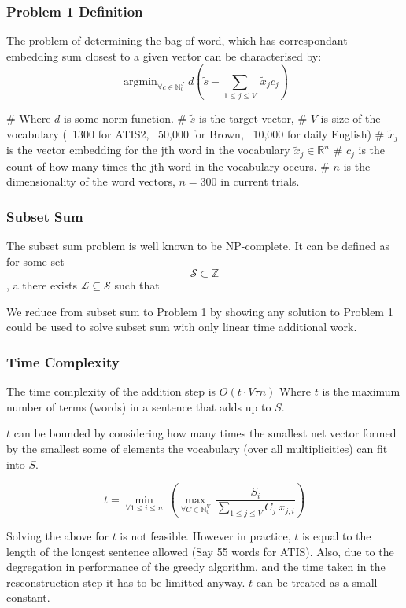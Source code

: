 \documentclass[]{scrartcl}
\DeclareMathOperator*{\argmin}{argmin}
\begin{document}
\subsubsection{{Problem 1 Definition}}
The problem of determining the bag of word, which has correspondant embedding sum closest to a given vector can be characterised by:
$$\argmin_{\forall c\in\mathbb{N}_0^J} d(\tilde{s} - \sum_{1\le j\le V}\:\tilde{x}_{j}c_{j})$$
\begin{easylist}[itemize]
# Where $d$ is some norm function.
# $\tilde{s}$ is the target vector,
# $V$ is size of the vocabulary (~1300 for ATIS2, ~50,000 for Brown, ~10,000 for daily English)
# $\tilde{x}_j$ is the vector embedding for the jth word in the vocabulary $\tilde{x}_j \in \mathbb{R}^n$
# $c_j$ is the count of how many times the jth word in the vocabulary occurs.
# $n$ is the dimensionality of the word vectors, $n = 300$ in current trials.  
\end{easylist}

\subsubsection{Subset Sum}
The subset sum problem is well known to be NP-complete.
It can be defined as for some set $$\mathcal{S}\subset\mathbb{Z}$$, a there exists  $\mathcal{L}\subseteq\mathcal{S}$ such that 


We reduce from subset sum to Problem 1 by showing any solution to Problem 1 could be used to solve subset sum with only linear time additional work.





\subsubsection{Time Complexity}
The time complexity of the addition step is $O(t \cdot V\tau n)$
Where $t$ is the maximum number of terms (words) in a sentence that adds up to $S$.

$t$ can be bounded by considering how many times the smallest net vector formed by the smallest some of elements the vocabulary (over all multiplicities) can fit into $S$.

$$t = \min_{\forall 1 \le i \le n}\: \left(\max_{\forall C \in \mathbb{N}_0^V}\: \frac{S_i}{\sum_{1\le j \le V} C_j\: x_{j,i}} \right)$$

Solving the above for $t$ is not feasible. However in practice, $t$ is equal to the length of the longest sentence allowed (Say 55 words for ATIS). Also, due to the degregation in performance of the greedy algorithm, and the time taken in the resconstruction step it has to be limitted anyway. $t$ can be treated as a small constant.
\end{document}
